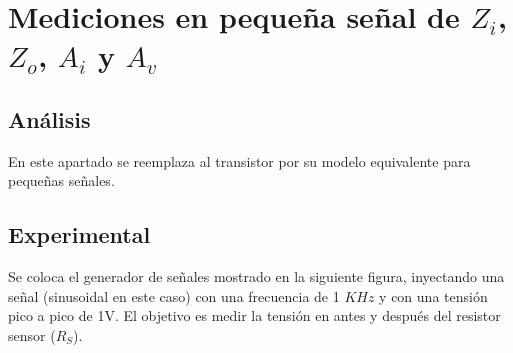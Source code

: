 \section{Mediciones en pequeña señal de $Z_i$, $Z_o$, $A_i$ y $A_v$}
\begin{multicols}{2}
    \subsection{Análisis}
    \sangria{} En este apartado se reemplaza al transistor por su modelo equivalente para pequeñas señales.
    \subsection{Experimental}
    \sangria{} Se coloca el generador de señales mostrado en la siguiente figura, inyectando una señal (sinusoidal en este caso) con una frecuencia de 1 $KHz$ y con una tensión pico a pico de 1V. El objetivo es medir la tensión en antes y después del resistor sensor ($R_S$).
\end{multicols}
